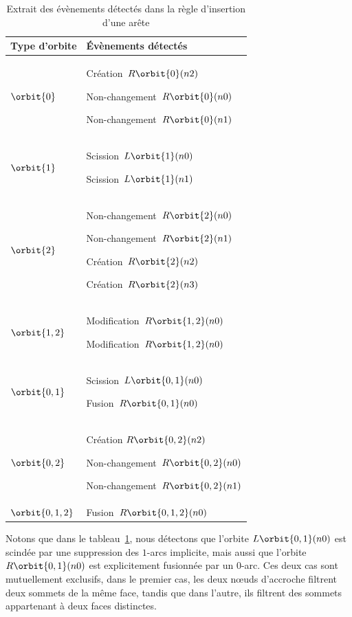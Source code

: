 \begin{table}[htb!]
	\caption{\label{tab:formalisation-evenements-regle-jerboa-tableau-detection-insertion-arete}
		Extrait des évènements détectés dans la règle d'insertion d'une arête}
	\centering
	\begin{tabular}{|p{}|p{}|}
		\hline
		\centering Type d'orbite   & Évènements détectés             \\
		\hline

		\centering $\orbit{0}$     & Création~$R\orbit{0}(n2)$
		\par Non-changement~$R\orbit{0}(n0)$
		\par Non-changement~$R\orbit{0}(n1)$                         \\
		\hline

		\centering $\orbit{1}$     & Scission~$L\orbit{1}(n0)$
		\par Scission~$L\orbit{1}(n1)$                               \\
		\hline

		\centering $\orbit{2}$     & Non-changement~$R\orbit{2}(n0)$
		\par Non-changement~$R\orbit{2}(n1)$
		\par Création~$R\orbit{2}(n2)$
		\par Création~$R\orbit{2}(n3)$                               \\
		\hline

		\centering $\orbit{1,2}$   & Modification~$R\orbit{1,2}(n0)$
		\par Modification~$R\orbit{1,2}(n0)$                         \\
		\hline

		\centering $\orbit{0,1}$   & Scission~$L\orbit{0,1}(n0)$
		\par Fusion~$R\orbit{0,1}(n0)$                               \\
		\hline

		\centering $\orbit{0,2}$   & Création $R\orbit{0,2}(n2)$
		\par Non-changement~$R\orbit{0,2}(n0)$
		\par Non-changement~$R\orbit{0,2}(n1)$                       \\
		\hline

		\centering $\orbit{0,1,2}$ & Fusion~$R\orbit{0,1,2}(n0)$     \\
		\hline
	\end{tabular}
	\normalsize

\end{table}

Notons que dans le
tableau~\ref{tab:formalisation-evenements-regle-jerboa-tableau-detection-insertion-arete},
nous détectons que l'orbite \(L\orbit{0,1}(n0)\) est scindée par une suppression
des \(1\)-arcs implicite, mais aussi que l'orbite \(R\orbit{0,1}(n0)\) est
explicitement fusionnée par un \(0\)-arc. %
Ces deux cas sont mutuellement exclusifs, dans le premier cas, les deux n\oe uds
d'accroche filtrent deux sommets de la même face, tandis que dans l'autre, ils
filtrent des sommets appartenant à deux faces distinctes. %
